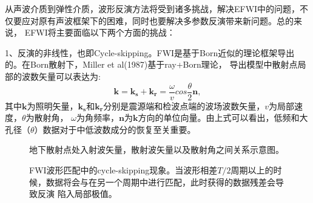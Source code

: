从声波介质到弹性介质，波形反演方法将受到诸多挑战，解决EFWI中的问题，不仅要应对原有声波框架下的困难，同时也要解决多参数反演带来新问题。总的来说，
EFWI将主要面临以下两个方面的挑战：

1、反演的非线性，也即Cycle-skipping。FWI是基于Born近似的理论框架导出的。在Born散射下，Miller et
al(1987)\cite{MillerEtAl1987}基于ray+Born理论，
导出模型中散射点局部的波数矢量可以表达为:
\begin{equation}
    \mathbf{k}=\mathbf{k_s}+\mathbf{k_r}=\frac{\omega}{v}cos\frac{\theta}{2}\mathbf{n},
    \label{eq:Modelwnb}
\end{equation}
其中$\mathbf{k}$为照明矢量，$\mathbf{k_s}$和$\mathbf{k_r}$分别是震源端和检波点端的波场波数矢量，$v$为局部速度，$\theta$为散射角，
$\omega$为角频率，$\mathbf{n}$为$\mathbf{k}$方向的单位向量。由上式可以看出，低频和大孔径（$\theta$）数据对于中低波数成分的恢复至关重要。
\begin{figure}[!htb] 
   \centering 
   \caption{地下散射点处入射波矢量，散射波矢量以及散射角之间关系示意图。}
   \label{fig:WavenumberVector}
\end{figure}
\begin{figure}[!htb] 
   \centering 
   \caption{FWI波形匹配中的cycle-skipping现象。当波形相差$T/2$周期以上的时候，数据将会与在另一个周期中进行匹配，此时获得的数据残差会导致反演
   陷入局部极值。}
   \label{fig:Cycleskipping}
\end{figure}
